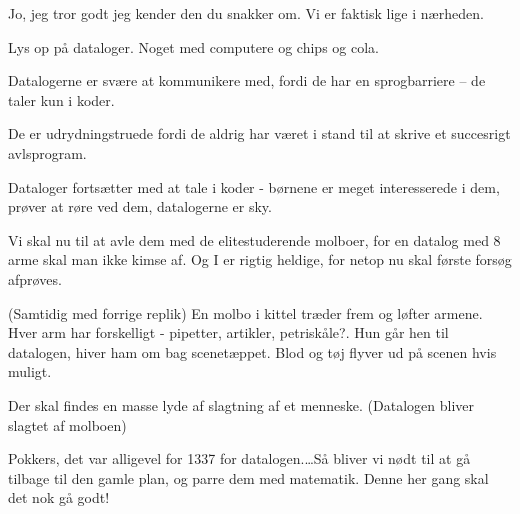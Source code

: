 \documentclass[a4paper,12pt]{article}
\begin{document}
\begin{sketch}
Jo, jeg tror godt jeg kender den du snakker om. Vi er faktisk lige i nærheden.

\scene Lys op på dataloger. Noget med computere og chips og cola.

Datalogerne er svære at kommunikere med, fordi de har en sprogbarriere -- de taler kun i koder.

De er udrydningstruede fordi de aldrig har været i stand til at skrive et succesrigt avlsprogram. %

\scene Dataloger fortsætter med at tale i koder - børnene er meget interesserede i dem, prøver at røre ved dem, datalogerne er sky.

Vi skal nu til at avle dem med de elitestuderende molboer, for en datalog med 8 arme skal man ikke kimse af. Og I er rigtig heldige, for netop nu skal første forsøg afprøves.

\scene (Samtidig med forrige replik) En molbo i kittel træder frem og løfter armene. Hver arm har forskelligt - pipetter, artikler, petriskåle?. Hun går hen til datalogen, hiver ham om bag scenetæppet. Blod og tøj flyver ud på scenen hvis muligt.

\scene Der skal findes en masse lyde af slagtning af et menneske. (Datalogen bliver slagtet af molboen)

  Pokkers, det var alligevel for 1337 for datalogen.\dots Så bliver vi nødt til at gå tilbage til den gamle plan, og parre dem med matematik. Denne her gang skal det nok gå godt!



\begin{comment}
\scene AntJ kommer ind på scenen fra bagtæppet.
\says{AntJ}[Helt roligt tonefald] Hr. Professor! Alarm, alarm. Biologerne er sluppet ud fra deres anlæg.
\says{AntJ}Helledusseda. Ja, det kan jeg da godt se, så må vi hellere gå ud og indfange dem! Vi får lige børnene i sikkerhed.

\scene Folk i biologtøj og -udstyr kommer ind i salen blandt publikum og nøgler, lupper. Nu kommer personale ind i salen for at indfange. Pædagoger og børn fordufter fra scenen.
\scene Mørkt på scenen

\scene Rødt lys på scenen. En personale stiller sig op på scenen.
\says{AntJ}[henvendt til publikum, forsøger at skjule sin ængstelse] Hallo derude! Ingen grund til panik \act{nervøs latter} men Biolog-situationen er lidt værre end først antaget; vi bliver nødt til at evakuere salen. Kom tilbage om 20 minutter, der burde vi have styr på det igen. Husk guldøl!

\scene Lyset i salen tændes
\end{comment}




\end{sketch}
\end{document}
